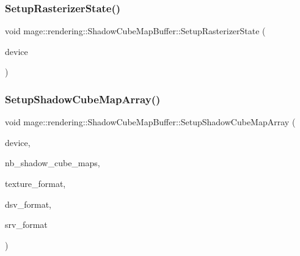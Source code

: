 \hypertarget{classmage_1_1rendering_1_1_shadow_cube_map_buffer_a65d31b9a335e6c27c8d4d6e0127029b2}{}\label{classmage_1_1rendering_1_1_shadow_cube_map_buffer_a65d31b9a335e6c27c8d4d6e0127029b2} 
\subsubsection{\texorpdfstring{Setup\+Rasterizer\+State()}{SetupRasterizerState()}}
{\footnotesize\ttfamily void mage\+::rendering\+::\+Shadow\+Cube\+Map\+Buffer\+::\+Setup\+Rasterizer\+State (\begin{DoxyParamCaption}\item[{I\+D3\+D11\+Device \&}]{device }\end{DoxyParamCaption})\hspace{0.3cm}{\ttfamily [private]}}

\hypertarget{classmage_1_1rendering_1_1_shadow_cube_map_buffer_ac800b8fde94ee7527ce09370b4f9e44a}{}\label{classmage_1_1rendering_1_1_shadow_cube_map_buffer_ac800b8fde94ee7527ce09370b4f9e44a} 
\subsubsection{\texorpdfstring{Setup\+Shadow\+Cube\+Map\+Array()}{SetupShadowCubeMapArray()}}
{\footnotesize\ttfamily void mage\+::rendering\+::\+Shadow\+Cube\+Map\+Buffer\+::\+Setup\+Shadow\+Cube\+Map\+Array (\begin{DoxyParamCaption}\item[{I\+D3\+D11\+Device \&}]{device,  }\item[{size\+\_\+t}]{nb\+\_\+shadow\+\_\+cube\+\_\+maps,  }\item[{D\+X\+G\+I\+\_\+\+F\+O\+R\+M\+AT}]{texture\+\_\+format,  }\item[{D\+X\+G\+I\+\_\+\+F\+O\+R\+M\+AT}]{dsv\+\_\+format,  }\item[{D\+X\+G\+I\+\_\+\+F\+O\+R\+M\+AT}]{srv\+\_\+format }\end{DoxyParamCaption})\hspace{0.3cm}{\ttfamily [private]}}

